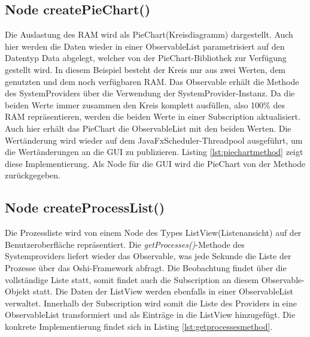 \subsection{Node createPieChart()}
 
Die Auslastung des RAM wird als PieChart(Kreisdiagramm) dargestellt. Auch hier werden die Daten wieder in einer ObservableList parametrisiert auf den Datentyp Data abgelegt, welcher von der PieChart-Bibliothek zur Verfügung gestellt wird. In diesem Beispiel besteht der Kreis nur aus zwei Werten, dem genutzten und dem noch verfügbaren RAM. Das Observable erhält die Methode des SystemProviders über die Verwendung der SystemProvider-Instanz. Da die beiden Werte immer zusammen den Kreis komplett ausfüllen, also 100\% des RAM repräsentieren, werden die beiden Werte in einer Subscription aktualisiert. Auch hier erhält das PieChart die ObservableList mit den beiden Werten. Die Wertänderung wird wieder auf dem JavaFxScheduler-Threadpool ausgeführt, um die Wertänderungen an die GUI zu publizieren. Listing \ref{lst:piechartmethod} zeigt diese Implementierung. Als Node für die GUI wird die PieChart von der Methode zurückgegeben.
\subsection{Node createProcessList()}

Die Prozessliste wird von einem Node des Types ListView(Listenansicht) auf der Benutzeroberfläche repräsentiert. Die \textit{getProcesses()}-Methode des Systemproviders liefert wieder das Observable, was jede Sekunde die Liste der Prozesse über das Oshi-Framework abfragt. Die Beobachtung findet über die vollständige Liste statt, somit findet auch die Subscription an diesem Observable-Objekt statt. Die Daten der ListView werden ebenfalls in einer ObservableList verwaltet. Innerhalb der Subscription wird somit die Liste des Providers in eine ObservableList transformiert und als Einträge in die ListView hinzugefügt. 
Die konkrete Implementierung findet sich in Listing \ref{lst:getprocessesmethod}.
